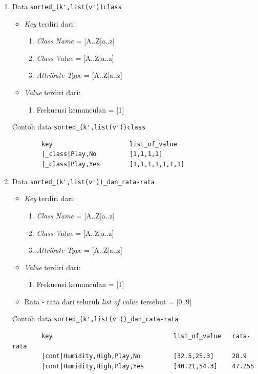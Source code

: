 \begin{enumerate}
	\item{Data \verb|sorted_(k',list(v'))class|}
	\begin{itemize}
		\item \textit{Key} terdiri dari:
		\begin{enumerate}
			\item \textit{Class Name} = [A..Z|a..z] 
			\item \textit{Class Value} = [A..Z|a..z]
			\item \textit{Attribute Type} = [A..Z|a..z] 
		\end{enumerate}
		\item \textit{Value} terdiri dari:
		\begin{enumerate}
			\item Frekuensi kemunculan = [1]
		\end{enumerate}
	\end{itemize}
	Contoh data \verb|sorted_(k',list(v'))class|
	\begin{lstlisting}
		key						list_of_value
		|_class|Play,No			[1,1,1,1]
		|_class|Play,Yes		[1,1,1,1,1,1,1]
	\end{lstlisting}

	\item{Data \verb|sorted_(k',list(v'))_dan_rata-rata|}
	\begin{itemize}
		\item \textit{Key} terdiri dari:
		\begin{enumerate}
			\item \textit{Class Name} = [A..Z|a..z] 
			\item \textit{Class Value} = [A..Z|a..z] 
			\item \textit{Attribute Type} = [A..Z|a..z] 
		\end{enumerate}
		\item \textit{Value} terdiri dari:
		\begin{enumerate}
			\item Frekuensi kemunculan = [1]
		\end{enumerate}
		\item Rata - rata dari seluruh \textit{list of value} tersebut = [0..9]
	\end{itemize}
	Contoh data \verb|sorted_(k',list(v'))_dan_rata-rata|
	\begin{lstlisting}
		key									list_of_value	rata-rata
		|cont|Humidity,High,Play,No			[32.5,25.3]		28.9	
		|cont|Humidity,High,Play,Yes		[40.21,54.3]	47.255
	\end{lstlisting}


\end{enumerate}
